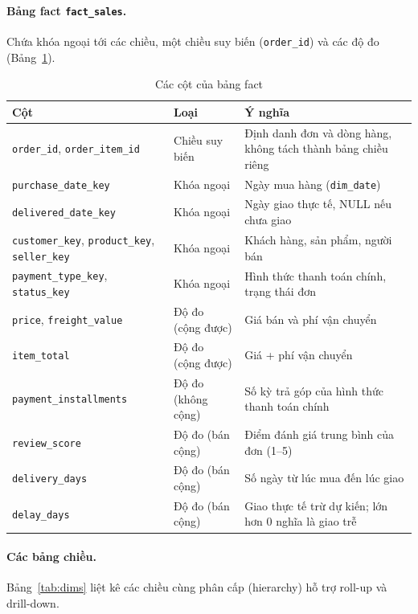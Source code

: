 \documentclass[12pt,a4paper]{article}
\newcommand{\code}[1]{\texttt{\small #1}}
\begin{document}
\paragraph{Bảng fact \code{fact\_sales}.}
Chứa khóa ngoại tới các chiều, một chiều suy biến (\code{order\_id}) và các độ đo (Bảng~\ref{tab:fact}).

\begin{table}[h]
\centering
\caption{Các cột của bảng fact}\label{tab:fact}
\small
\begin{tabularx}{\textwidth}{@{}l l X@{}}
\toprule
\textbf{Cột} & \textbf{Loại} & \textbf{Ý nghĩa}\\
\midrule
\code{order\_id}, \code{order\_item\_id} & Chiều suy biến & Định danh đơn và dòng hàng, không tách thành bảng chiều riêng\\
\code{purchase\_date\_key} & Khóa ngoại & Ngày mua hàng (\code{dim\_date})\\
\code{delivered\_date\_key} & Khóa ngoại & Ngày giao thực tế, NULL nếu chưa giao\\
\code{customer\_key}, \code{product\_key}, \code{seller\_key} & Khóa ngoại & Khách hàng, sản phẩm, người bán\\
\code{payment\_type\_key}, \code{status\_key} & Khóa ngoại & Hình thức thanh toán chính, trạng thái đơn\\
\code{price}, \code{freight\_value} & Độ đo (cộng được) & Giá bán và phí vận chuyển\\
\code{item\_total} & Độ đo (cộng được) & Giá + phí vận chuyển\\
\code{payment\_installments} & Độ đo (không cộng) & Số kỳ trả góp của hình thức thanh toán chính\\
\code{review\_score} & Độ đo (bán cộng) & Điểm đánh giá trung bình của đơn (1--5)\\
\code{delivery\_days} & Độ đo (bán cộng) & Số ngày từ lúc mua đến lúc giao\\
\code{delay\_days} & Độ đo (bán cộng) & Giao thực tế trừ dự kiến; lớn hơn 0 nghĩa là giao trễ\\
\bottomrule
\end{tabularx}
\end{table}

\paragraph{Các bảng chiều.}
Bảng~\ref{tab:dims} liệt kê các chiều cùng phân cấp (hierarchy) hỗ trợ roll-up và drill-down.
\end{document}
